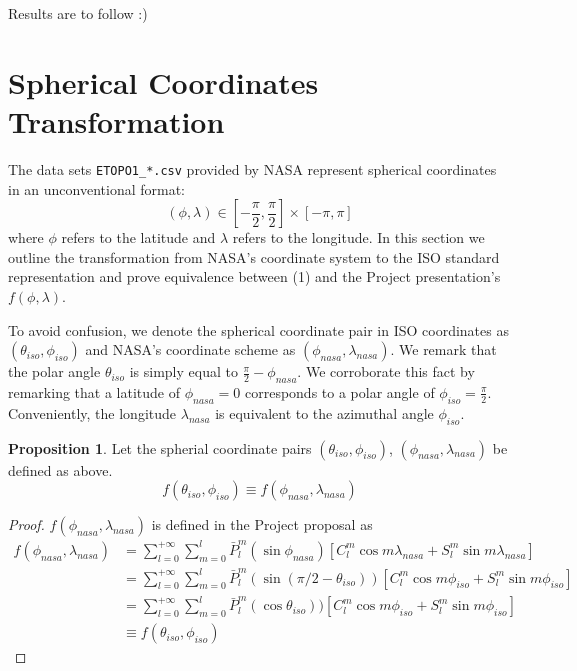 \documentclass[a4paper]{article}
\theoremstyle{definition}
\newtheorem{proposition}{Proposition}
\begin{document}
Results are to follow :)





\appendix
\section{Spherical Coordinates Transformation}

The data sets \verb|ETOPO1_*.csv| provided by NASA represent spherical coordinates in an unconventional format: $$(\phi, \lambda) \in [-\frac{\pi}{2}, \frac{\pi}{2}] \times [-\pi, \pi] $$ where $\phi$ refers to the latitude
and $\lambda$ refers to the longitude. In this section we outline the transformation from NASA's coordinate system to the ISO standard representation and prove equivalence between (1) and the Project presentation's $f(\phi, \lambda)$.

To avoid confusion, we denote the spherical coordinate pair in ISO coordinates as $(\theta_{iso}, \phi_{iso})$ and NASA's coordinate scheme as $(\phi_{nasa}, \lambda_{nasa})$.
We remark that the polar angle $\theta_{iso}$ is simply equal to $\frac{\pi}{2} - \phi_{nasa}$. We corroborate this fact by remarking that a latitude of $\phi_{nasa} = 0$ corresponds to a polar
angle of $\phi_{iso} = \frac{\pi}{2}$. Conveniently, the longitude $\lambda_{nasa}$ is equivalent to the azimuthal angle $\phi_{iso}$.

\begin{proposition} Let the spherial coordinate pairs $(\theta_{iso}, \phi_{iso})$, $(\phi_{nasa}, \lambda_{nasa})$ be defined as above. 
    \begin{equation*}
        f(\theta_{iso}, \phi_{iso}) \equiv f(\phi_{nasa}, \lambda_{nasa})
    \end{equation*}

    
\end{proposition}



\begin{proof}
    $f(\phi_{nasa}, \lambda_{nasa})$ is defined in the Project proposal as 
    \begin{align} \label{eq:project_def} 
        f(\phi_{nasa}, \lambda_{nasa}) &= \sum_{l = 0}^{+\infty}\sum_{m = 0}^l \bar P_l^m(\sin\phi_{nasa})[C_l^m\cos m\lambda_{nasa} + S_l^m \sin m \lambda_{nasa}] \\ 
                                       &= \sum_{l = 0}^{+\infty}\sum_{m = 0}^l \bar P_l^m(\sin(\pi/2 - \theta_{iso}))[C_l^m\cos m\phi_{iso} + S_l^m \sin m \phi_{iso}] \\
                                       &= \sum_{l = 0}^{+\infty}\sum_{m = 0}^l \bar P_l^m(\cos\theta_{iso}))[C_l^m\cos m\phi_{iso} + S_l^m \sin m \phi_{iso}] \\
                                       &\equiv f(\theta_{iso}, \phi_{iso})
    \end{align}

\end{proof}
\end{document}
